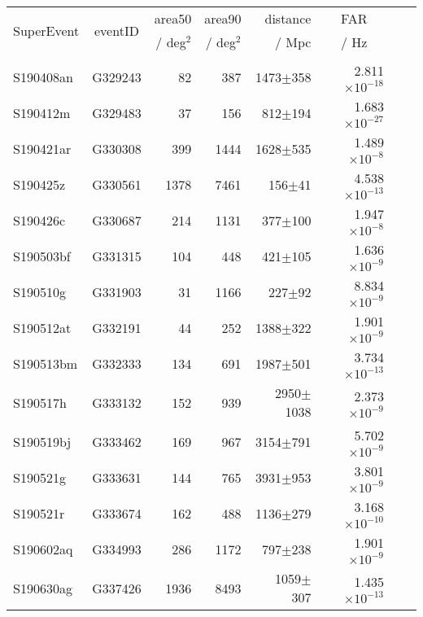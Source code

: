 \begin{table}
\centering 
\pagecolor{black}
\color{white}
\begin{tabular}{  l c r r r r l r }
\hline
\hline
  \multirow{2}{* }{SuperEvent} & \multirow{2}{*}{eventID}  &  \multicolumn{1}{r}{area50}          &   \multicolumn{1}{r}{area90}          &   \multicolumn{1}{r}{distance}  &   \multicolumn{1}{c}{FAR} \\
                                               &                                        &  \multicolumn{1}{r}{ / deg$^{2}$}  &   \multicolumn{1}{r}{ / deg$^{2}$}  &   \multicolumn{1}{r}{/ Mpc}      &   \multicolumn{1}{c}{ / Hz} \\
\hline
&&&&& \\
  S190408an & G329243 & 82 & 387        & 1473$\pm$358         & 2.811$\times10^{-18}$\\
  S190412m & G329483 & 37 & 156         &   812$\pm$194         & 1.683$\times10^{-27}$\\
  S190421ar & G330308 & 399 & 1444     & 1628$\pm$535        & 1.489$\times10^{-8}$\\
  S190425z & G330561 & 1378 & 7461    &   156$\pm$41        & 4.538$\times10^{-13}$\\
  S190426c & G330687 & 214 & 1131      &   377$\pm$100    & 1.947$\times10^{-8}$\\
  S190503bf & G331315 & 104 & 448      &   421$\pm$105    & 1.636$\times10^{-9}$\\
  S190510g & G331903 & 31 & 1166       &   227$\pm$92       & 8.834$\times10^{-9}$\\
  S190512at & G332191 & 44 & 252        & 1388$\pm$322    & 1.901$\times10^{-9}$\\
  S190513bm & G332333 & 134 & 691    & 1987$\pm$501    & 3.734$\times10^{-13}$\\
  S190517h & G333132 & 152 & 939       & 2950$\pm$1038   & 2.373$\times10^{-9} $\\
  S190519bj & G333462 & 169 & 967      & 3154$\pm$791     & 5.702$\times10^{-9}$\\
  S190521g & G333631 & 144 & 765       & 3931$\pm$953     & 3.801$\times10^{-9}$\\
  S190521r & G333674 & 162 & 488        & 1136$\pm$279     & 3.168$\times10^{-10}$\\
  S190602aq & G334993 & 286 & 1172    &  797$\pm$238     & 1.901$\times10^{-9}$\\
  S190630ag & G337426 & 1936 & 8493  & 1059$\pm$ 307     & 1.435$\times10^{-13}$\\

\end{tabular}
\end{table}
